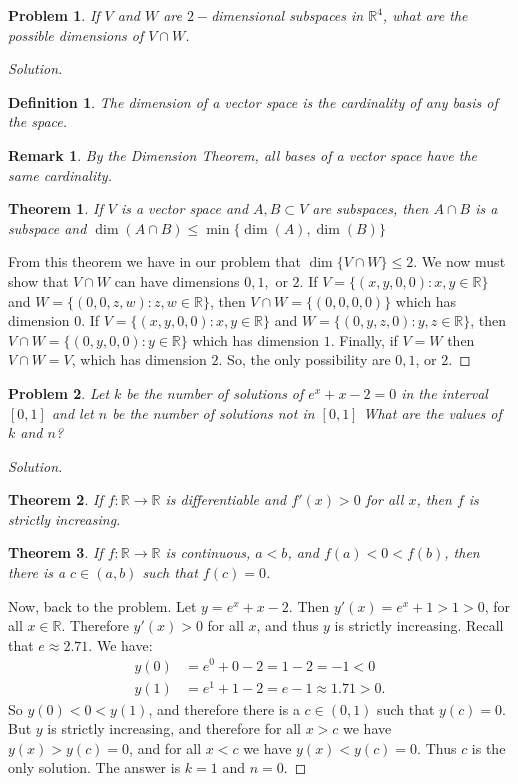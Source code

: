 \documentclass[crop=false,class=book]{standalone}
\theoremstyle{mystyle}
\newtheorem{problem}{Problem}[section]
\newtheorem*{theorem*}{Theorem}
\newtheorem*{definition*}{Definition}
\newtheorem*{remark*}{Remark}
\begin{document}
\begin{problem}
If $V$ and $W$ are $2-$dimensional subspaces in $\mathbb{R}^4$, what are the possible dimensions of $V\cap W$.
\end{problem}
\begin{proof}[Solution]
\begin{definition*}
The dimension of a vector space is the cardinality of any basis of the space. 
\end{definition*}
\begin{remark*}
By the Dimension Theorem, all bases of a vector space have the same cardinality.
\end{remark*}
\begin{theorem*}
If $V$ is a vector space and $A,B\subset V$ are subspaces, then $A\cap B$ is a subspace and $\dim(A\cap B) \leq \min\{\dim(A),\dim(B)\}$
\end{theorem*}
From this theorem we have in our problem that $\dim\{V\cap W\} \leq 2$. We now must show that $V\cap W$ can have dimensions $0,1,$ or $2$. If $V = \{(x,y,0,0):x,y\in \mathbb{R}\}$ and $W = \{(0,0,z,w):z,w\in \mathbb{R}\}$, then $V\cap W = \{(0,0,0,0)\}$ which has dimension $0$. If $V = \{(x,y,0,0):x,y\in \mathbb{R}\}$ and $W = \{(0,y,z,0):y,z\in \mathbb{R}\}$, then $V\cap W = \{(0,y,0,0):y\in \mathbb{R}\}$ which has dimension $1$. Finally, if $V=W$ then $V\cap W = V$, which has dimension $2$. So, the only possibility are $0,1$, or $2$.
\end{proof}
\begin{problem}
Let $k$ be the number of solutions of $e^x+x-2 = 0$ in the interval $[0,1]$ and let $n$ be the number of solutions not in $[0,1]$ What are the values of $k$ and $n$?
\end{problem}
\begin{proof}[Solution]
\begin{theorem*}
If $f:\mathbb{R}\rightarrow \mathbb{R}$ is differentiable and $f'(x) >0$ for all $x$, then $f$ is strictly increasing.
\end{theorem*}
\begin{theorem*}
If $f:\mathbb{R}\rightarrow \mathbb{R}$ is continuous, $a<b$, and $f(a)<0<f(b)$, then there is a $c\in (a,b)$ such that $f(c) = 0$.
\end{theorem*}
Now, back to the problem. Let $y=e^x+x-2$. Then $y'(x) = e^x+1 > 1 > 0$, for all $x\in \mathbb{R}$. Therefore $y'(x)>0$ for all $x$, and thus $y$ is strictly increasing. Recall that $e\approx 2.71$. We have:
\begin{align*}
    y(0) &= e^0 + 0 - 2 = 1-2 = -1 <0 \\
    y(1) &= e^1+1-2 = e-1 \approx 1.71 > 0.
\end{align*}
So $y(0)<0<y(1)$, and therefore there is a $c\in (0,1)$ such that $y(c) = 0$. But $y$ is strictly increasing, and therefore for all $x>c$ we have $y(x)>y(c) = 0$, and for all $x<c$ we have $y(x)<y(c) = 0$. Thus $c$ is the only solution. The answer is $k=1$ and $n=0$.
\end{proof}
\end{document}
